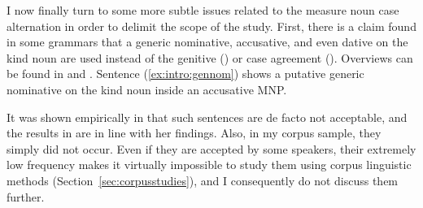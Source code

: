 I now finally turn to some more subtle issues related to the measure noun case alternation in order to delimit the scope of the study.
First, there is a claim found in some grammars that a generic nominative, accusative, and even dative on the kind noun are used instead of the genitive (\PGCa) or case agreement (\NACa).
Overviews can be found in \cite{Hentschel1993} and \cite{Zimmer2015}.
Sentence (\ref{ex:intro:gennom}) shows a putative generic nominative on the kind noun inside an accusative MNP.

\begin{exe}
\end{exe}

It was shown empirically in \cite{Hentschel1993} that such sentences are de facto not acceptable, and the results in \citet{Zimmer2015} are in line with her findings.
Also, in my corpus sample, they simply did not occur.
Even if they are accepted by some speakers, their extremely low frequency makes it virtually impossible to study them using corpus linguistic methods (Section~\ref{sec:corpusstudies}), and I consequently do not discuss them further.


